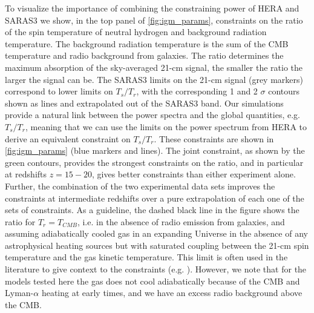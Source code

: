 To visualize the importance of combining the constraining power of HERA and SARAS3 we show, in the top panel of \cref{fig:igm_params}, constraints on the ratio of the spin temperature of neutral hydrogen and background radiation temperature. The background radiation temperature is the sum of the CMB temperature and radio background from galaxies. The ratio determines the maximum absorption of the sky-averaged 21-cm signal, the smaller the ratio the larger the signal can be. The SARAS3 limits on the 21-cm signal (grey markers) correspond to lower limits on $T_s/T_r$, with the corresponding 1 and 2 $\sigma$ contours shown as lines and extrapolated out of the SARAS3 band. Our simulations provide a natural link between the power spectra and the global quantities, e.g. $T_s/T_r$, meaning that we can use the limits on the power spectrum from HERA to derive an equivalent constraint on $T_s/T_r$. These constraints are shown in \cref{fig:igm_params} (blue markers and lines). The joint constraint, as shown by the green contours, provides the strongest constraints on the ratio, and in particular at redshifts $z=15 - 20$, gives better constraints than either experiment alone. Further, the combination of the two experimental data sets improves the constraints at intermediate redshifts over a pure extrapolation of each one of the sets of constraints. As a guideline, the dashed black line in the figure shows the ratio for $T_r = T_{CMB}$, i.e. in the absence of radio emission from galaxies, and assuming adiabatically cooled gas in an expanding Universe in the absence of any astrophysical heating sources but with saturated coupling between the 21-cm spin temperature and the gas kinetic temperature. This limit is often used in the literature to give context to the constraints (e.g. \cite{HERA_2022b, HERA_2022c}). However, we note that for the models tested here the gas does not cool adiabatically because of the CMB and Lyman-$\alpha$ heating at early times, and we have an excess radio background above the CMB.

